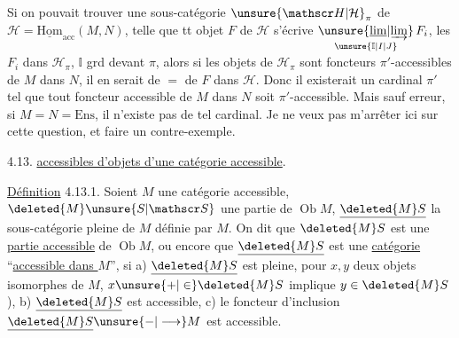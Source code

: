 Si on pouvait trouver une sous-catégorie
$\unsure{\mathscr H|\mathcal H}_\pi$ de $\mathscr H=\underline{\mathrm{Hom}}_{\mathrm{acc}}(M,N)$,  telle que tt
objet $F$ de $\mathscr H$ s'écrive $\underset{\unsure{\mathbb I|I|J}}{\unsure{\underline{\lim}|\underrightarrow{\lim}}}\,F_i$, les
$F_i$ dans $\mathscr H_\pi$, $\mathbb I$ grd devant $\pi$, alors
 si les objets de $\mathscr H_\pi$ sont 
foncteurs $\pi'$-accessibles de $M$ dans $N$\unsure{\}}, 
il en serait de $=$ de  $F$ dans $\mathscr H$.
Donc il existerait un cardinal  $\pi'$
tel que tout foncteur accessible de
$M$ dans $N$ soit $\pi'$-accessible. Mais
sauf erreur, si  $M=N=\mathrm{Ens}$, il n'existe
pas de tel cardinal. Je ne veux
pas m'arrêter ici sur cette question,
et faire un contre-exemple.

4.13. \uline{ accessibles d'objets d'une
catégorie accessible}.

\uline{Définition} 4.13.1. Soient $M$ une catégorie
accessible, $\deleted{M}\unsure{S|\mathscr S}$ une partie de $\operatorname{Ob}M$,
$\underline{\deleted{M}S}$ la sous-catégorie pleine de $M$ définie
par $M$. On dit que $\deleted{M}S$ est une
\uline{partie accessible} de $\operatorname{Ob}M$, ou encore
que $\underline{\deleted{M}S}$ est une \uline{catégorie} ``\uline{accessible
dans $M$}'', si a) $\underline{\deleted{M}S}$ est  pleine,
 pour  $x,y$
deux objets isomorphes de $M$, $x\unsure{+|\in}\deleted{M}S$
implique $y\in\deleted{M}S$),  b) $\underline{\deleted{M}S}$ est
accessible, c) le foncteur d'inclusion
$\underline{\deleted{M}S}\unsure{-|\longrightarrow}M$ est accessible.

